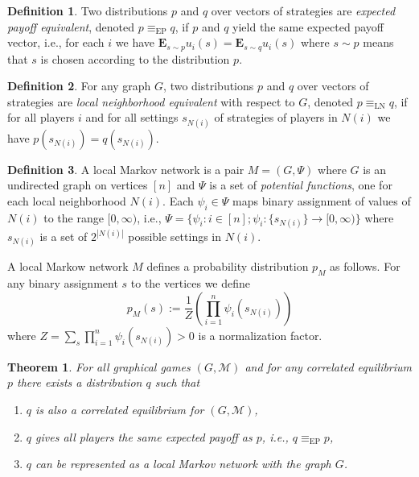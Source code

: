 \documentclass{article}
\newtheorem{theorem}{Theorem}
\theoremstyle{definition}
\newtheorem*{definition}{Definition}
\newcommand{\calM}{\mathcal{M}}
\newcommand{\E}{\mathbf{E}}
\begin{document}
\begin{definition}
Two distributions $p$ and $q$ over vectors of strategies are \textit{expected payoff equivalent},
denoted $p \equiv_{\mathrm{EP}} q$, if $p$ and $q$ yield the same expected payoff vector, i.e.,
for each $i$ we have $\E_{s \sim p} u_i(s) = \E_{s \sim q} u_i(s)$ where $s \sim p$ means that $s$ is chosen
according to the distribution $p$.
\end{definition}

\begin{definition}
For any graph $G$, two distributions $p$ and $q$ over vectors of strategies are
\textit{local neighborhood equivalent} with respect to $G$, denoted $p \equiv_{\mathrm{LN}} q$,
if for all players $i$ and for all settings $s_{N(i)}$ of strategies of players in $N(i)$
we have $p(s_{N(i)}) = q(s_{N(i)})$.
\end{definition}

\begin{definition}
A local Markov network is a pair $M = (G, \Psi)$ where $G$ is an undirected graph on vertices $[n]$
and $\Psi$ is a set of \textit{potential functions}, one for each local neighborhood $N(i)$.
Each $\psi_i \in \Psi$ maps binary assignment of values of $N(i)$ to the range $[0,\infty)$,
i.e., $\Psi = \{ \psi_i: i \in [n]; \psi_i: \{ s_{N(i)} \} \rightarrow [0, \infty )\}$
where $s_{N(i)}$ is a set of $2^{|N(i)|}$ possible settings in $N(i)$.

A local Markow network $M$ defines a probability distribution $p_M$ as follows.
For any binary assignment $s$ to the vertices we define
$$p_M(s) := \frac{1}{Z}\left( \prod_{i=1}^n \psi_i (s_{N(i)}) \right)$$
where $Z = \sum_s \prod_{i=1}^n \psi_i (s_{N(i)}) > 0$ is a normalization factor.
\end{definition}

\begin{theorem}
For all graphical games $(G, \calM)$ and for any correlated equilibrium $p$
there exists a distribution $q$ such that
\begin{enumerate}
\item $q$ is also a correlated equilibrium for $(G, \calM)$,
\item $q$ gives all players the same expected payoff as $p$, i.e., $q \equiv_{\mathrm{EP}} p$,
\item $q$ can be represented as a local Markov network with the graph $G$.
\end{enumerate}


\end{theorem}
\end{document}
